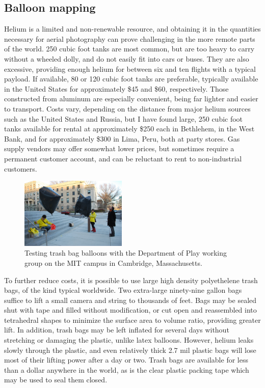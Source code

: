 \documentclass[11pt,oneside,notitlepage]{report}
\begin{document}
\subsection{Balloon mapping}

Helium is a limited and non-renewable resource, and obtaining it in the quantities necessary for aerial photography can prove challenging in the more remote parts of the world. 250 cubic foot tanks are most common, but are too heavy to carry without a wheeled dolly, and do not easily fit into cars or buses. They are also excessive, providing enough helium for between six and ten flights with a typical payload. If available, 80 or 120 cubic foot tanks are preferable, typically available in the United States for approximately \$45 and \$60, respectively. Those constructed from aluminum are especially convenient, being far lighter and easier to transport. Costs vary, depending on the distance from major helium sources such as the United States and Russia, but I have found large, 250 cubic foot tanks available for rental at approximately \$250 each in Bethlehem, in the West Bank, and for approximately \$300 in Lima, Peru, both at party stores. Gas supply vendors may offer somewhat lower prices, but sometimes require a permanent customer account, and can be reluctant to rent to non-industrial customers. 

\begin{figure}
	\begin{flushright}
		\includegraphics[width=0.45\textwidth]{images/trash-bag-ballooning.jpg}
		\caption{Testing trash bag balloons with the Department of Play working group on the MIT campus in Cambridge, Massachusetts.}
	\end{flushright}
\end{figure}

To further reduce costs, it is possible to use large high density polyethelene trash bags, of the kind typical worldwide. Two extra-large ninety-nine gallon bags suffice to lift a small camera and string to thousands of feet. Bags may be sealed shut with tape and filled without modification, or cut open and reassembled into tetrahedral shapes to minimize the surface area to volume ratio, providing greater lift. In addition, trash bags may be left inflated for several days without stretching or damaging the plastic, unlike latex balloons. However, helium leaks slowly through the plastic, and even relatively thick 2.7 mil plastic bags will lose most of their lifting power after a day or two. Trash bags are available for less than a dollar anywhere in the world, as is the clear plastic packing tape which may be used to seal them closed.  
\end{document}
